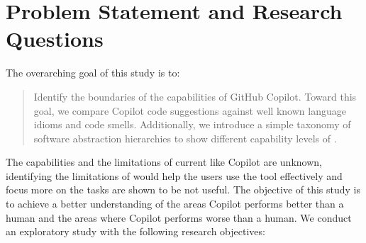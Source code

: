 \section{Problem Statement and Research Questions}
The overarching goal of this study is to:
\begin{quote}
    Identify the boundaries of the capabilities of GitHub Copilot. Toward this goal, we compare Copilot code suggestions against well known language idioms and code smells. Additionally, we introduce a simple taxonomy of software abstraction hierarchies to show different capability levels of \cct{}. 
\end{quote}

The capabilities and the limitations of current \cct{} like Copilot are unknown, identifying the limitations of \cct{} would help the users use the tool effectively and focus more on the tasks \cct{} are shown to be not useful. 
The objective of this study is to achieve a better understanding of the areas Copilot performs better than a human and the areas where Copilot performs worse than a human. We conduct an exploratory study with the following research objectives:

